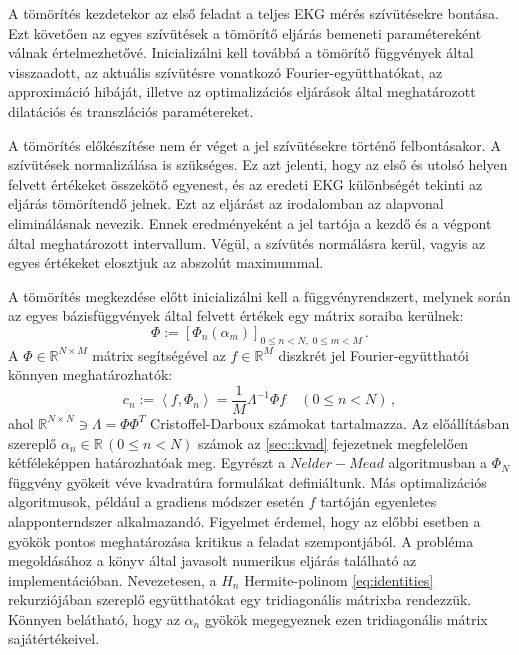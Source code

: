 \documentclass[oneside,titlepage,12pt,a4paper]{report}
\begin{document}
A tömörítés kezdetekor az első feladat a teljes EKG mérés szívütésekre bontása. Ezt követően
az egyes szívütések a tömörítő eljárás bemeneti paramétereként válnak értelmezhetővé. Inicializálni kell továbbá
a tömörítő függvények által visszaadott, az aktuális szívütésre vonatkozó Fourier-együtthatókat, 
az approximáció hibáját, illetve az optimalizációs eljárások által meghatározott dilatációs és 
transzlációs paramétereket. \par
	
A tömörítés előkészítése nem ér véget a jel szívütésekre történő felbontásakor. A szívütések normalizálása is szükséges. Ez azt jelenti, hogy az első és utolsó helyen felvett értékeket összekötő egyenest, és az eredeti EKG különbségét tekinti az eljárás tömörítendő jelnek. Ezt az eljárást az irodalomban az alapvonal eliminálásnak nevezik. Ennek eredményeként a jel tartója a kezdő és a végpont által meghatározott intervallum. Végül, a szívütés normálásra kerül, vagyis az egyes értékeket 
elosztjuk az abszolút maximummal. \par
	A tömörítés megkezdése előtt inicializálni kell a függvényrendszert, 
melynek során az egyes bázisfüggvények által felvett értékek egy mátrix soraiba kerülnek: 
\begin{equation*}
	\Phi:=\left[\Phi_n(\alpha_m)\right]_{0\leq n < N,\;0\leq m < M}\,.
	\label{eq:phi_matrix}
\end{equation*}
A $\Phi\in\mathbb{R}^{N\times M}$ mátrix segítségével az $f\in\mathbb{R}^M$ diszkrét jel Fourier-együtthatói könnyen meghatározhatók:
\begin{equation*}
	c_n:=\left\langle f, \Phi_n \right\rangle=\frac{1}{M} \Lambda^{-1} \Phi f \quad (0\leq n < N)\,,
	\label{eq:phi_coeffs}
\end{equation*}
ahol $\mathbb{R}^{N\times N}\ni\Lambda=\Phi \Phi^T$ Cristoffel-Darboux számokat tartalmazza. Az előállításban szereplő $\alpha_n\in\mathbb{R}\, (0\leq n < N)$ számok az \ref{sec::kvad} fejezetnek megfelelően kétféleképpen határozhatóak meg. Egyrészt a $Nelder-Mead$ algoritmusban a $\Phi_N$ függvény gyökeit véve kvadratúra formulákat definiáltunk. Más optimalizációs algoritmusok, például a gradiens módszer esetén $f$ tartóján egyenletes alapponterndszer alkalmazandó. Figyelmet érdemel, hogy az előbbi esetben a gyökök pontos meghatározása kritikus a feladat szempontjából. A probléma megoldásához a \cite{gautschi} könyv által javasolt numerikus eljárás található az implementációban. Nevezetesen, a $H_n$ Hermite-polinom \eqref{eq:identities} rekurziójában szereplő együtthatókat egy tridiagonális mátrixba rendezzük. Könnyen belátható, hogy az $\alpha_n$ gyökök megegyeznek ezen tridiagonális mátrix sajátértékeivel.  \par
\end{document}
